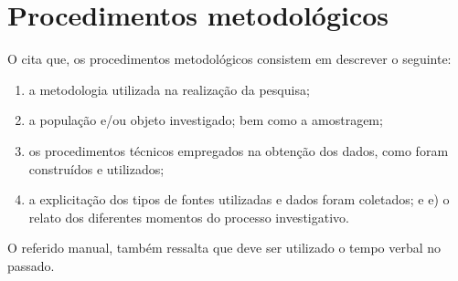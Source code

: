 \chapter{Procedimentos metodológicos}

O  cita que, os procedimentos metodológicos consistem em descrever o seguinte:

\begin{enumerate}[label=\alph*)]
    \item a metodologia utilizada na realização da pesquisa;
    \item a população e/ou objeto investigado; bem como a amostragem;
    \item os procedimentos técnicos empregados na obtenção dos dados, como foram
construídos e utilizados;
    \item a explicitação dos tipos de fontes utilizadas e dados foram coletados; e e) o relato dos diferentes momentos do processo investigativo.
\end{enumerate}

O referido manual, também ressalta que deve ser utilizado o tempo verbal no passado.